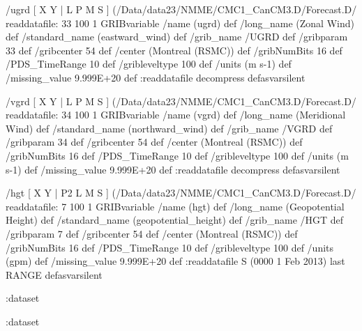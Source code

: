 \begin{ingrid}
/ugrd {
[ X Y | L P M S ] (/Data/data23/NMME/CMC1_CanCM3.D/Forecast.D/%
readdatafile:
33 100 1 GRIBvariable 
/name (ugrd) def
/long_name (Zonal Wind) def
/standard_name (eastward_wind) def
/grib_name /UGRD def
/gribparam 33 def
/gribcenter 54 def
/center (Montreal (RSMC)) def
/gribNumBits 16 def
/PDS_TimeRange 10 def
/gribleveltype 100 def
/units (m s-1) def
/missing_value 9.999E+20 def
:readdatafile decompress
} defasvarsilent

/vgrd {
[ X Y | L P M S ] (/Data/data23/NMME/CMC1_CanCM3.D/Forecast.D/%
readdatafile:
34 100 1 GRIBvariable 
/name (vgrd) def
/long_name (Meridional Wind) def
/standard_name (northward_wind) def
/grib_name /VGRD def
/gribparam 34 def
/gribcenter 54 def
/center (Montreal (RSMC)) def
/gribNumBits 16 def
/PDS_TimeRange 10 def
/gribleveltype 100 def
/units (m s-1) def
/missing_value 9.999E+20 def
:readdatafile decompress
} defasvarsilent

/hgt {
[ X Y | P2 L M S ] (/Data/data23/NMME/CMC1_CanCM3.D/Forecast.D/%
readdatafile:
7 100 1 GRIBvariable 
/name (hgt) def
/long_name (Geopotential Height) def
/standard_name (geopotential_height) def
/grib_name /HGT def
/gribparam 7 def
/gribcenter 54 def
/center (Montreal (RSMC)) def
/gribNumBits 16 def
/PDS_TimeRange 10 def
/gribleveltype 100 def
/units (gpm) def
/missing_value 9.999E+20 def
:readdatafile
S (0000 1 Feb 2013) last RANGE
} defasvarsilent

:dataset

:dataset
\end{ingrid}
